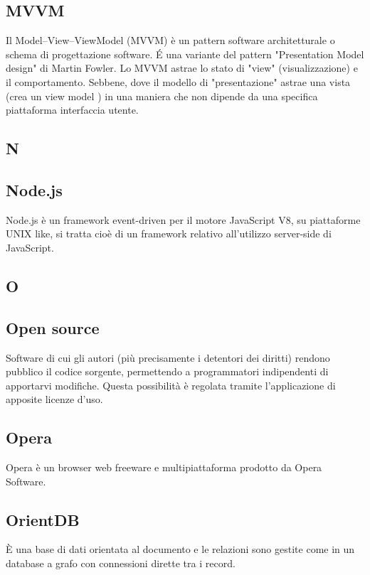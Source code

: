 \subsection{MVVM}
Il Model–View–ViewModel (MVVM) è un pattern software architetturale o schema di progettazione software. É una variante del pattern "Presentation Model design" di Martin Fowler. Lo MVVM astrae lo stato di "view" (visualizzazione) e il comportamento. Sebbene, dove il modello di "presentazione" astrae una vista (crea un view model ) in una maniera che non dipende da una specifica piattaforma interfaccia utente.

\newpage

\begin{center}
\Huge\section{\uppercase{N}}
\end{center}

\subsection{Node.js}
Node.js è un framework event-driven per il motore JavaScript V8, su piattaforme UNIX
like, si tratta cioè di un framework relativo all'utilizzo server-side di JavaScript.

\newpage

\begin{center}
\Huge\section{\uppercase{O}}
\end{center}

\subsection{Open source}
Software di cui gli autori (più precisamente i detentori dei diritti) rendono pubblico
il codice sorgente, permettendo a programmatori indipendenti di apportarvi modifiche.
Questa possibilità è regolata tramite l'applicazione di apposite licenze d'uso.

\subsection{Opera}
Opera è un browser web freeware e multipiattaforma prodotto da Opera Software.

\subsection{OrientDB}
È una base di dati orientata al documento e le relazioni sono gestite come in un database a grafo con connessioni dirette tra i record.

